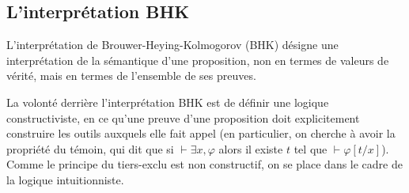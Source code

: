 \documentclass{article}
\begin{document}
\subsection{L'interprétation BHK}

L'interprétation de Brouwer-Heying-Kolmogorov (BHK) désigne une interprétation de la sémantique d'une proposition, non en termes de valeurs de vérité, mais en termes de l'ensemble de ses preuves.

La volonté derrière l'interprétation BHK est de définir une logique constructiviste, en ce qu'une preuve d'une proposition doit explicitement construire les outils auxquels elle fait appel (en particulier, on cherche à avoir la propriété du témoin, qui dit que si $\vdash \exists x, \varphi$ alors il existe $t$ tel que $\vdash \varphi[t/x]$). Comme le principe du tiers-exclu est non constructif, on se place dans le cadre de la logique intuitionniste.
\end{document}
